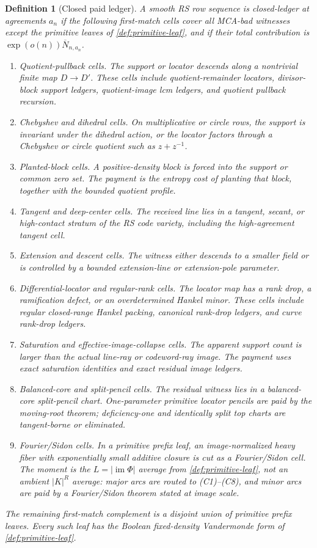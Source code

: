 \documentclass[11pt,a4paper]{amsart}
\numberwithin{equation}{section}
\newtheorem{definition}[theorem]{Definition}
\theoremstyle{remark}
\newcommand{\barN}{\overline N}
\begin{document}
\begin{definition}[Closed paid ledger]\label{def:closed-ledger}
A smooth RS row sequence is \emph{closed-ledger} at agreements \(a_n\) if the following first-match cells cover all MCA-bad witnesses except the primitive leaves of \cref{def:primitive-leaf}, and if their total contribution is \(\exp(o(n))\barN_{n,a_n}\).
\begin{enumerate}[label=\textup{(C\arabic*)},leftmargin=2.7em]
    \item \emph{Quotient-pullback cells.}  The support or locator descends along a nontrivial finite map \(D\to D'\).  These cells include quotient-remainder locators, divisor-block support ledgers, quotient-image lcm ledgers, and quotient pullback recursion.
    \item \emph{Chebyshev and dihedral cells.}  On multiplicative or circle rows, the support is invariant under the dihedral action, or the locator factors through a Chebyshev or circle quotient such as \(z+z^{-1}\).
    \item \emph{Planted-block cells.}  A positive-density block is forced into the support or common zero set.  The payment is the entropy cost of planting that block, together with the bounded quotient profile.
    \item \emph{Tangent and deep-center cells.}  The received line lies in a tangent, secant, or high-contact stratum of the RS code variety, including the high-agreement tangent cell.
    \item \emph{Extension and descent cells.}  The witness either descends to a smaller field or is controlled by a bounded extension-line or extension-pole parameter.
    \item \emph{Differential-locator and regular-rank cells.}  The locator map has a rank drop, a ramification defect, or an overdetermined Hankel minor.  These cells include regular closed-range Hankel packing, canonical rank-drop ledgers, and curve rank-drop ledgers.
    \item \emph{Saturation and effective-image-collapse cells.}  The apparent support count is larger than the actual line-ray or codeword-ray image.  The payment uses exact saturation identities and exact residual image ledgers.
    \item \emph{Balanced-core and split-pencil cells.}  The residual witness lies in a balanced-core split-pencil chart.  One-parameter primitive locator pencils are paid by the moving-root theorem; deficiency-one and identically split top charts are tangent-borne or eliminated.
    \item \emph{Fourier/Sidon cells.}  In a primitive prefix leaf, an image-normalized heavy fiber with exponentially small additive closure is cut as a Fourier/Sidon cell.  The moment is the \(L=|\operatorname{im}\Phi|\) average from \cref{def:primitive-leaf}, not an ambient \(|K|^R\) average: major arcs are routed to \textup{(C1)--(C8)}, and minor arcs are paid by a Fourier/Sidon theorem stated at image scale.
\end{enumerate}
The remaining first-match complement is a disjoint union of primitive prefix leaves.  Every such leaf has the Boolean fixed-density Vandermonde form of \cref{def:primitive-leaf}.
\end{definition}
\end{document}
